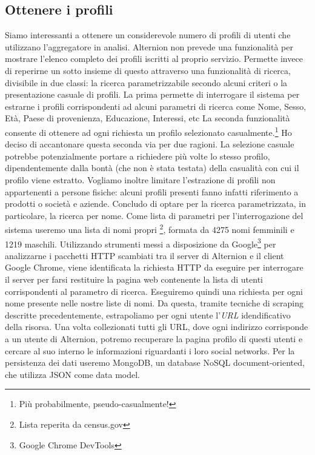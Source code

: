 \subsection{Ottenere i profili}
Siamo interessanti a ottenere un considerevole numero di profili di utenti che utilizzano l'aggregatore in analisi. Alternion non prevede una funzionalità per mostrare l'elenco completo dei profili iscritti al proprio servizio. Permette invece di reperirne un sotto insieme di questo attraverso una funzionalità di ricerca, divisibile in due classi: la ricerca parametrizzabile secondo alcuni criteri o la presentazione casuale di profili. La prima permette di interrogare il sistema per estrarne i profili corrispondenti ad alcuni parametri di ricerca come Nome, Sesso, Età, Paese di provenienza, Educazione, Interessi, etc La seconda funzionalità consente di ottenere ad ogni richiesta un profilo selezionato casualmente.\footnote{Più probabilmente, pseudo-casualmente!} Ho deciso di accantonare questa seconda via per due ragioni. La selezione casuale potrebbe potenzialmente portare a richiedere più volte lo stesso profilo, dipendentemente dalla bontà (che non è stata testata) della casualità con cui il profilo viene estratto. Vogliamo inoltre limitare l'estrazione di profili non appartenenti a persone fisiche: alcuni profili presenti fanno infatti riferimento a prodotti o società e aziende. Concludo di optare per la ricerca parametrizzata, in particolare, la ricerca per nome. Come lista di parametri per l'interrogazione del sistema useremo una lista di nomi propri \footnote{Lista reperita da census.gov}, formata da 4275 nomi femminili e 1219 maschili. Utilizzando strumenti messi a disposizione da Google\footnote{Google Chrome DevTools} per analizzarne i pacchetti HTTP scambiati tra il server di Alternion e il client Google Chrome, viene identificata la richiesta HTTP da eseguire per interrogare il server per farsi restituire la pagina web contenente la lista di utenti corrispondenti al parametro di ricerca. Eseguiremo quindi una richiesta per ogni nome presente nelle nostre liste di nomi. Da questa, tramite tecniche di scraping descritte precedentemente, estrapoliamo per ogni utente l'\textit{URL} idendificativo della risorsa. Una volta collezionati tutti gli URL, dove ogni indirizzo corrisponde a un utente di Alternion, potremo recuperare la pagina profilo di questi utenti e cercare al suo interno le informazioni riguardanti i loro social networks. Per la persistenza dei dati useremo MongoDB, un database NoSQL document-oriented, che utilizza JSON come data model.
